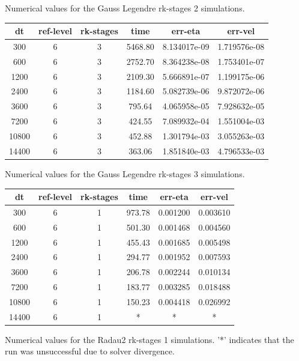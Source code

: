 \documentclass[a4paper, 12pt]{article}
\begin{document}
{Numerical values for the Gauss Legendre rk-stages 2 simulations.}
\\
\begin{tabular}{c|c|c|c|c|c}
dt    & ref-level &  rk-stages & time    & err-eta      &    err-vel \\ \hline
300    &       6   &        3  & 5468.80  & 8.134017e-09  & 1.719576e-08 \\
600     &      6    &       3  & 2752.70  & 8.364238e-08  & 1.753401e-07\\
1200     &      6    &       3  & 2109.30  & 5.666891e-07  & 1.199175e-06\\
2400     &      6    &       3  & 1184.60  & 5.082739e-06  & 9.872072e-06\\
3600      &     6     &      3  &  795.64  & 4.065958e-05  & 7.928632e-05\\
7200      &     6      &     3   & 424.55  & 7.089932e-04  & 1.551004e-03\\
10800     &      6     &      3  &  452.88  & 1.301794e-03  & 3.055263e-03\\
14400      &     6     &      3   & 363.06   &1.851840e-03  & 4.796533e-03\\
\end{tabular}
{Numerical values for the Gauss Legendre rk-stages 3 simulations.}
\\
\begin{tabular}{c|c|c|c|c|c}
dt    & ref-level &  rk-stages & time    & err-eta      &    err-vel \\ \hline
300    &      6   &       1 & 973.78 & 0.001200 & 0.003610 \\
600    &      6   &       1 & 501.30 & 0.001468 & 0.004560\\
1200   &       6   &       1 & 455.43 & 0.001685 & 0.005498\\
2400   &       6   &       1 & 294.77 & 0.001952 & 0.007593\\
3600    &      6    &      1 & 206.78 & 0.002244 & 0.010134\\
7200   &       6    &      1 & 183.77 & 0.003285 & 0.018488\\
10800   &       6   &       1 & 150.23 & 0.004418 & 0.026992\\
14400   &       6   &       1 & * & * & *
\end{tabular}
    {Numerical values for the Radau2 rk-stages 1 simulations. '*' indicates
      that the run was unsuccessful due to solver divergence.}
\\
\end{document}
